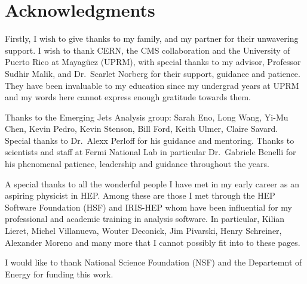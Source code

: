 \chapter{Acknowledgments}

Firstly, I wish to give thanks to my family, and my partner for their unwavering support.
I wish to thank CERN, the CMS collaboration and the University of Puerto Rico at Mayagüez (UPRM), with special thanks to my advisor, Professor Sudhir Malik, and Dr.~Scarlet Norberg for their support, guidance and patience. They have been invaluable to my education since my undergrad years at UPRM and my words here cannot express enough gratitude towards them.

Thanks to the Emerging Jets Analysis group: Sarah Eno, Long Wang, Yi-Mu Chen, Kevin Pedro, Kevin Stenson, Bill Ford, Keith Ulmer, Claire Savard. Special thanks to Dr.~Alexx Perloff for his guidance and mentoring. Thanks to scientists and staff at Fermi National Lab in particular Dr.~Gabriele Benelli for his phenomenal patience, leadership and guidance throughout the years.

A special thanks to all the wonderful people I have met in my early career as an aspiring physicist in HEP. Among these are those I met through the HEP Software Foundation (HSF) and IRIS-HEP whom have been influential for my professional and academic training in analysis software. In particular, Kilian Lieret, Michel Villanueva, Wouter Deconick, Jim Pivarski, Henry Schreiner, Alexander Moreno and many more that I cannot possibly fit into to these pages.

I would like to thank National Science Foundation (NSF) and the Departemnt of Energy for funding this work.
